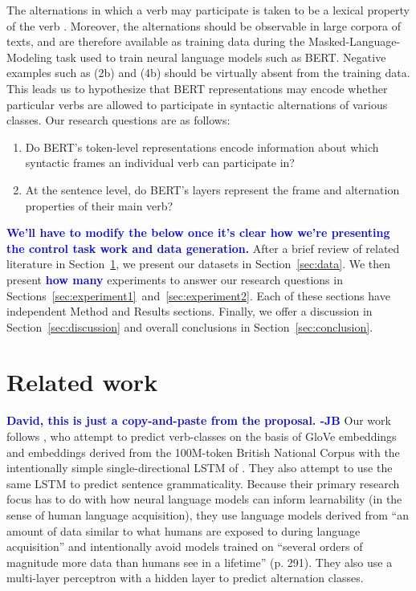 \documentclass[11pt]{article}
\newcommand{\hey}[1]{\textcolor{blue}{\textbf{#1}}}
\begin{document}
The alternations in which a verb may participate is taken to be a lexical property of the verb \citep[e.g.][]{pinker1989,levin1993,levin1995unaccusativity,shafer2009causative}.  Moreover, the alternations should be observable in large corpora of texts, and are therefore available as training data during the Masked-Language-Modeling task used to train neural language models such as BERT.  Negative examples such as (2b) and (4b) should be virtually absent from the training data.  This leads us to hypothesize that BERT representations may encode whether particular verbs are allowed to participate in syntactic alternations of various classes.  Our research questions are as follows:

\begin{enumerate}
    \item Do BERT's token-level representations encode information about which syntactic frames an individual verb can participate in?
    \item At the sentence level, do BERT's layers represent the frame and alternation properties of their main verb?
    
\end{enumerate}

\hey{We'll have to modify the below once it's clear how we're presenting the control task work and data generation.}
After a brief review of related literature in Section~\ref{sec:litreview}, we present our datasets in Section~\ref{sec:data}.  We then present \hey{how many} experiments to answer our research questions in Sections~\ref{sec:experiment1}~and~\ref{sec:experiment2}.  Each of these sections have independent Method and Results sections.  Finally, we offer a discussion in Section~\ref{sec:discussion} and overall conclusions in Section~\ref{sec:conclusion}.

\section{Related work}
\label{sec:litreview}
\hey{David, this is just a copy-and-paste from the proposal. -JB}
Our work follows \citet{kann-etal-2019-verb}, who attempt to predict verb-classes on the basis of GloVe embeddings \citep{glove} and embeddings derived from the 100M-token British National Corpus with the intentionally simple single-directional LSTM of \citealt{warstadt2019neural}.  They also attempt to use the same LSTM to predict sentence grammaticality.  Because their primary research focus has to do with how neural language models can inform learnability (in the sense of human language acquisition), they use language models derived from ``an amount of data similar to what humans are exposed to during language acquisition'' and intentionally avoid models trained on ``several orders of magnitude more data than humans see in a lifetime'' (p. 291).  They also use a multi-layer perceptron with a hidden layer to predict alternation classes.  
\end{document}
